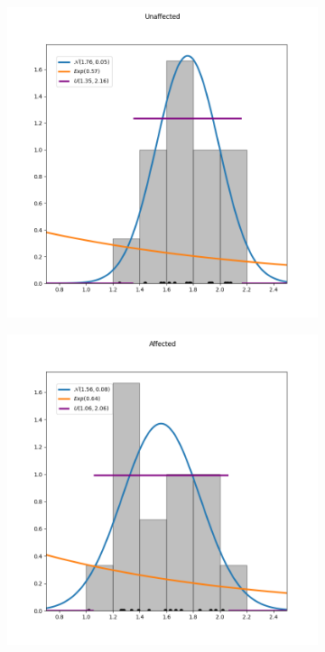 \documentclass[12pt,a4paper]{article} %
\begin{document}
\begin{figure}[h!]
\centering
\begin{subfigure}{0.48\textwidth}
  \centering
  \includegraphics[scale=0.4]{./img/unaffected_distributions.png}
  \label{fig:unaff_dists}
\end{subfigure}
\begin{subfigure}{0.48\textwidth}
  \centering
  \includegraphics[scale=0.4]{./img/affected_distributions.png}
  \label{fig:aff_dists}
\end{subfigure}
\end{figure}
\end{document}
